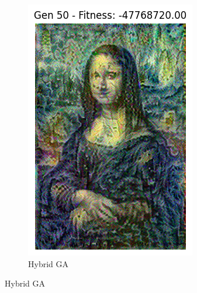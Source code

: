 \documentclass[a4paper,12pt]{article}
\begin{document}
\begin{figure}[H]
\begin{subfigure}{0.2\textwidth}
    \includegraphics[width=\linewidth]{mona_ga.png}
    \caption{Hybrid GA}
\end{subfigure}
\end{figure}
\end{document}
